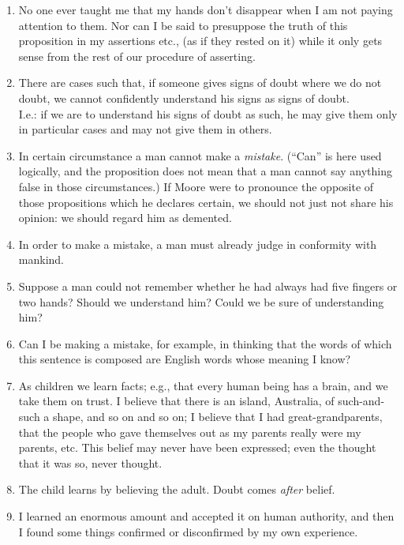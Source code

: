\documentclass{book}
\begin{document}
\begin{enumerate}
\item
No one ever taught me that my hands don't disappear when I am not paying
attention to them. Nor can I be said to presuppose the truth of this
proposition in my assertions etc., (as if they rested on it) while it only gets
sense from the rest of our procedure of asserting.

\item
There are cases such that, if someone gives signs of doubt where we do not
doubt, we cannot confidently understand his signs as signs of doubt. \\
I.e.: if we are to understand his signs of doubt as such, he may give them only
in particular cases and may not give them in others.

\item
In certain circumstance a man cannot make a \emph{mistake}. (``Can'' is here
used logically, and the proposition does not mean that a man cannot say
anything false in those circumstances.) If Moore were to pronounce the opposite
of those propositions which he declares certain, we should not just not share
his opinion: we should regard him as demented.

\item
In order to make a mistake, a man must already judge in conformity with
mankind.

\item
Suppose a man could not remember whether he had always had five fingers or two
hands? Should we understand him? Could we be sure of understanding him?

\item
Can I be making a mistake, for example, in thinking that the words of which
this sentence is composed are English words whose meaning I know?

\item
As children we learn facts; e.g., that every human being has a brain, and we
take them on trust. I believe that there is an island, Australia, of
such-and-such a shape, and so on and so on; I believe that I had
great-grandparents, that the people who gave themselves out as my parents
really were my parents, etc. This belief may never have been expressed; even
the thought that it was so, never thought.

\item
The child learns by believing the adult. Doubt comes \emph{after} belief.

\item
I learned an enormous amount and accepted it on human authority, and then I
found some things confirmed or disconfirmed by my own experience.


\end{enumerate}
\end{document}
